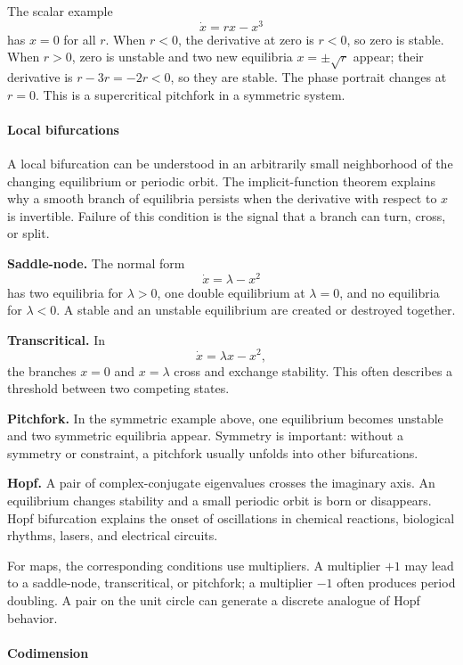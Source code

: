 The scalar example
\[
 \dot x=rx-x^3
\]
has $x=0$ for all $r$. When $r<0$, the derivative at zero is $r<0$, so zero is stable. When $r>0$, zero is unstable and two new equilibria $x=\pm\sqrt r$ appear; their derivative is $r-3r=-2r<0$, so they are stable. The phase portrait changes at $r=0$. This is a supercritical pitchfork in a symmetric system.

\paragraph{Local bifurcations}

A local bifurcation can be understood in an arbitrarily small neighborhood of the changing equilibrium or periodic orbit. The implicit-function theorem explains why a smooth branch of equilibria persists when the derivative with respect to $x$ is invertible. Failure of this condition is the signal that a branch can turn, cross, or split.

\textbf{Saddle-node.} The normal form
\[
 \dot x=\lambda-x^2
\]
has two equilibria for $\lambda>0$, one double equilibrium at $\lambda=0$, and no equilibria for $\lambda<0$. A stable and an unstable equilibrium are created or destroyed together.

\textbf{Transcritical.} In
\[
 \dot x=\lambda x-x^2,
\]
the branches $x=0$ and $x=\lambda$ cross and exchange stability. This often describes a threshold between two competing states.

\textbf{Pitchfork.} In the symmetric example above, one equilibrium becomes unstable and two symmetric equilibria appear. Symmetry is important: without a symmetry or constraint, a pitchfork usually unfolds into other bifurcations.

\textbf{Hopf.} A pair of complex-conjugate eigenvalues crosses the imaginary axis. An equilibrium changes stability and a small periodic orbit is born or disappears. Hopf bifurcation explains the onset of oscillations in chemical reactions, biological rhythms, lasers, and electrical circuits.

For maps, the corresponding conditions use multipliers. A multiplier $+1$ may lead to a saddle-node, transcritical, or pitchfork; a multiplier $-1$ often produces period doubling. A pair on the unit circle can generate a discrete analogue of Hopf behavior.

\paragraph{Codimension}


